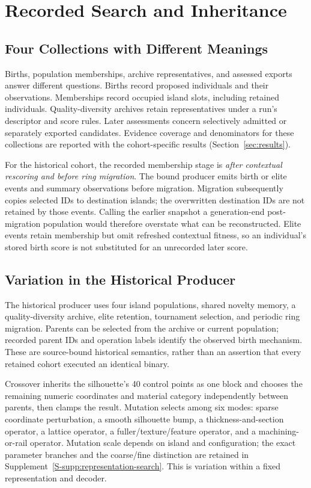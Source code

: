 \section{Recorded Search and Inheritance}
\label{sec:evolution}

\subsection{Four Collections with Different Meanings}
Births, population memberships, archive representatives, and assessed exports answer different questions. Births record proposed individuals and their observations. Memberships record occupied island slots, including retained individuals. Quality-diversity archives retain representatives under a run's descriptor and score rules. Later assessments concern selectively admitted or separately exported candidates. Evidence coverage and denominators for these collections are reported with the cohort-specific results (Section~\ref{sec:results}).

For the historical cohort, the recorded membership stage is \emph{after contextual rescoring and before ring migration}. The bound producer emits birth or elite events and summary observations before migration. Migration subsequently copies selected IDs to destination islands; the overwritten destination IDs are not retained by those events. Calling the earlier snapshot a generation-end post-migration population would therefore overstate what can be reconstructed. Elite events retain membership but omit refreshed contextual fitness, so an individual's stored birth score is not substituted for an unrecorded later score.

\subsection{Variation in the Historical Producer}
The historical producer uses four island populations, shared novelty memory, a quality-diversity archive, elite retention, tournament selection, and periodic ring migration. Parents can be selected from the archive or current population; recorded parent IDs and operation labels identify the observed birth mechanism. These are source-bound historical semantics, rather than an assertion that every retained cohort executed an identical binary.

Crossover inherits the silhouette's 40 control points as one block and chooses the remaining numeric coordinates and material category independently between parents, then clamps the result. Mutation selects among six modes: sparse coordinate perturbation, a smooth silhouette bump, a thickness-and-section operator, a lattice operator, a fuller/texture/feature operator, and a machining-or-rail operator. Mutation scale depends on island and configuration; the exact parameter branches and the coarse/fine distinction are retained in Supplement~\ref{S-supp:representation-search}. This is variation within a fixed representation and decoder.

